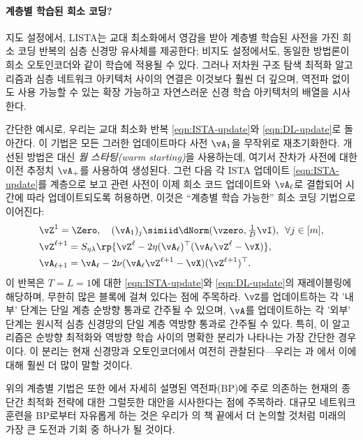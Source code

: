 \documentclass[../../book-main_ko.tex]{subfiles}
\begin{document}
\paragraph{계층별 학습된 희소 코딩?}



지도 설정에서, LISTA는 교대 최소화에서 영감을 받아 계층별 학습된 사전을 가진 희소 코딩 반복의 심층 신경망 유사체를 제공한다; 비지도 설정에서도, 동일한 방법론이 희소 오토인코더와 같이 학습에 적용될 수 있다. 그러나 저차원 구조 탐색 최적화 알고리즘과 심층 네트워크 아키텍처 사이의 연결은 이것보다 훨씬 더 깊으며, 역전파 없이도 사용 가능할 수 있는 확장 가능하고 자연스러운 신경 학습 아키텍처의 배열을 시사한다.

간단한 예시로, 우리는 교대 최소화 반복 \eqref{eqn:ISTA-update}와 \eqref{eqn:DL-update}로 돌아간다. 이 기법은 모든 그러한 업데이트마다 사전 $\vA_1$을 무작위로 재초기화한다. 개선된 방법은 대신 \textit{웜 스타팅(warm starting)}을 사용하는데, 여기서 잔차가 사전에 대한 이전 추정치 $\vA_+$를 사용하여 생성된다. 그런 다음 각 ISTA 업데이트 \eqref{eqn:ISTA-update}를 계층으로 보고 관련 사전이 이제 희소 코드 업데이트와 $\vA_\ell$로 결합되어 시간에 따라 업데이트되도록 허용하면, 이것은 ``계층별 학습 가능한'' 희소 코딩 기법으로 이어진다:
\begin{align}
    & \vZ^{1}
     = \Zero, \quad (\vA_{1})_j
     \simiid \dNorm(\vzero, \tfrac{1}{D}\vI), \enspace \forall j \in [m], \\
    & \vZ^{\ell + 1} = S_{\eta\lambda}\rp{\vZ^{\ell}
    - 2\eta(\vA_{\ell})^\top(\vA_{\ell}\vZ^{\ell}
    - \vX)},\label{eq:ISTA-update-layerwise}\\
    & \vA_{\ell + 1} = \vA_{\ell}- 2\nu (\vA_{\ell}\vZ^{\ell + 1}
    - \vX)(\vZ^{\ell + 1})^\top.
\end{align}
이 반복은 $T = L = 1$에 대한 \eqref{eqn:ISTA-update}와 \eqref{eqn:DL-update}의 재레이블링에 해당하며, 무한히 많은 블록에 걸쳐 있다는 점에 주목하라. $\vZ$를 업데이트하는 각 '내부' 단계는 단일 계층 순방향 통과로 간주될 수 있으며, $\vA$를 업데이트하는 각 '외부' 단계는 원시적 심층 신경망의 단일 계층 역방향 통과로 간주될 수 있다. 특히, 이 알고리즘은 순방향 최적화와 역방향 학습 사이의 명확한 분리가 나타나는 가장 간단한 경우이다. 이 분리는 현재 신경망과 오토인코더에서 여전히 관찰된다—우리는 과 에서 이에 대해 훨씬 더 많이 말할 것이다.

위의 계층별 기법은 또한 에서 자세히 설명된 역전파(BP)에 주로 의존하는 현재의 종단간 최적화 전략에 대한 그럴듯한 대안을 시사한다는 점에 주목하라. 대규모 네트워크 훈련을 BP로부터 자유롭게 하는 것은 우리가 의 책 끝에서 더 논의할 것처럼 미래의 가장 큰 도전과 기회 중 하나가 될 것이다.
\end{document}

